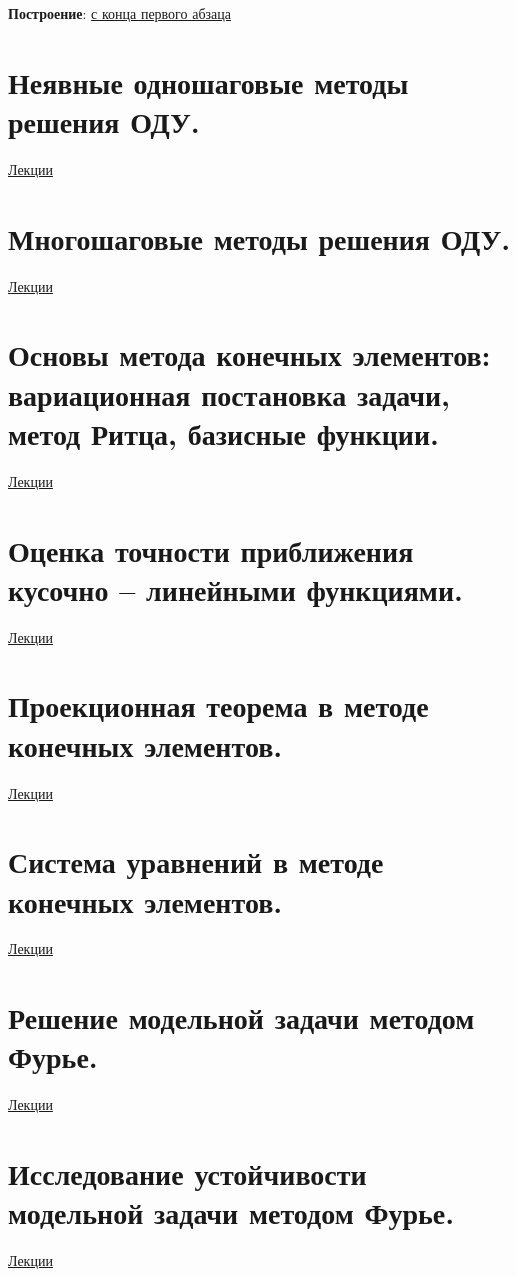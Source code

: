 \documentclass[specialist, subf, href, colorlinks=true, 12pt, times, mtpro, final]{disser}
\theoremstyle{definition}
\begin{document}
	\textbf{Построение}: \hyperlink {lects.89}{с конца первого абзаца}\\

\section {Неявные одношаговые методы решения ОДУ.}
	\hyperlink {lects.91}{Лекции}\\

\section {Многошаговые методы решения ОДУ.}
	\hyperlink {lects.92}{Лекции}\\

\section {Основы метода конечных элементов: вариационная постановка задачи, метод Ритца, базисные функции.}
	\hyperlink {lects.97}{Лекции}\\

\section {Оценка точности приближения кусочно -- линейными функциями.}
	\hyperlink {lects.102}{Лекции}\\

\section {Проекционная теорема в методе конечных элементов.}
	\hyperlink {lects.103}{Лекции}\\

\section {Система уравнений в методе конечных элементов.}
	\hyperlink {lects.106}{Лекции}\\

\section {Решение модельной задачи методом Фурье.}
	\hyperlink {lects.108}{Лекции}\\

\section {Исследование устойчивости модельной задачи методом Фурье.}
	\hyperlink {lects.111}{Лекции}\\
\end{document}
